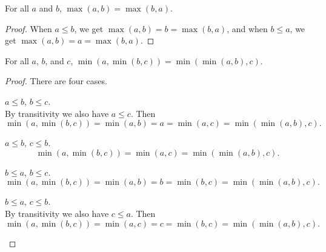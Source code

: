 \documentclass[../math.tex]{subfiles}
\begin{document}
\begin{theorem} \label{max-comm}
    For all $a$ and $b$, $\max(a, b) = \max(b, a)$.
\end{theorem}
\begin{proof}
    When $a \leq b$, we get $\max(a, b) = b = \max(b, a)$, and when $b \leq a$,
    we get $\max(a, b) = a = \max(b, a)$.
\end{proof}

\begin{theorem}
    For all $a$, $b$, and $c$, $\min(a, \min(b, c)) = \min(\min(a, b), c)$.
\end{theorem}
\begin{proof}
    There are four cases.
    \begin{case} $a \leq b$, $b \leq c$. \\
        By transitivity we also have $a \leq c$.  Then
        \[
            \min(a, \min(b, c)) = \min(a, b) =
            a
            = \min(a, c) = \min(\min(a, b), c).
        \]
    \end{case}
    \begin{case} $a \leq b$, $c \leq b$.
        \[
            \min(a, \min(b, c)) =
            \min(a, c)
            = \min(\min(a, b), c).
        \]
    \end{case}
    \begin{case} $b \leq a$, $b \leq c$.
        \[
            \min(a, \min(b, c)) = \min(a, b) =
            b
            = \min(b, c) = \min(\min(a, b), c).
        \]
    \end{case}
    \begin{case} $b \leq a$, $c \leq b$. \\
        By transitivity we also have $c \leq a$.  Then
        \[
            \min(a, \min(b, c)) = \min(a, c) =
            c
            = \min(b, c) = \min(\min(a, b), c).
        \]
    \end{case}
\end{proof}
\end{document}
